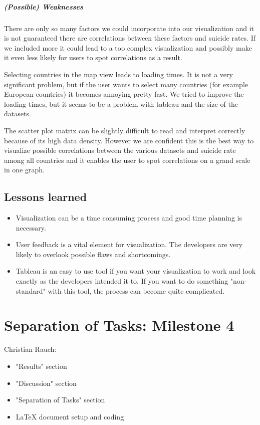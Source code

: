 \documentclass{vgtc}                          %
\begin{document}
\subparagraph{(Possible) Weaknesses}
There are only so many factors we could incorporate into our visualization and it is not guaranteed there are correlations between these factors and suicide rates. If we included more it could lead to a too complex visualization and possibly make it even less likely for users to spot correlations as a result.

Selecting countries in the map view leads to loading times. It is not a very significant problem, but if the user wants to select many countries (for example European countries) it becomes annoying pretty fast. We tried to improve the loading times, but it seems to be a problem with tableau and the size of the datasets.

The scatter plot matrix can be slightly difficult to read and interpret correctly because of its high data density. However we are confident this is the best way to visualize possible correlations between the various datasets and suicide rate among all countries and it enables the user to spot correlations on a grand scale in one graph.

\subsection{Lessons learned}

\begin{itemize}
\item Visualization can be a time consuming process and good time planning is necessary.
\item User feedback is a vital element for visualization. The developers are very likely to overlook possible flaws and shortcomings.
\item Tableau is an easy to use tool if you want your visualization to work and look exactly as the developers intended it to. If you want to do something "non-standard" with this tool, the process can become quite complicated.
\end{itemize}

\section{Separation of Tasks: Milestone 4}
Christian Rauch:
\begin{itemize}
\item "Results" section
\item "Discussion" section
\item "Separation of Tasks" section
\item LaTeX document setup and coding
\end{itemize}
\end{document}
